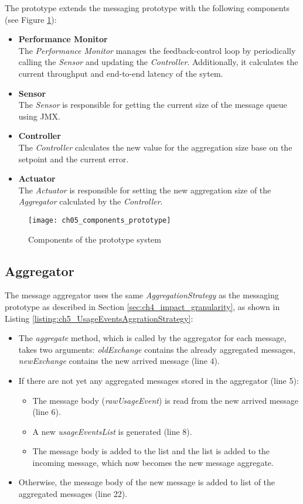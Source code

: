 The prototype extends the messaging prototype with the following components (see Figure \ref{fig:ch05_components_prototype}):
\begin{itemize}
	\item \textbf{Performance Monitor}\\
	The \emph{Performance Monitor} manages the feedback-control loop by periodically calling the \emph{Sensor} and updating the \emph{Controller}. Additionally, it calculates the current throughput and end-to-end latency of the sytem.
	\item \textbf{Sensor}\\
	The \emph{Sensor} is responsible for getting the current size of the message queue using \ac{JMX}.
	\item \textbf{Controller}\\
	The \emph{Controller} calculates the new value for the aggregation size base on the setpoint and the current error.
	\item \textbf{Actuator}\\
	The \emph{Actuator} is responsible for setting the new aggregation size of the \emph{Aggregator} calculated by the \emph{Controller}.
\end{itemize}

\begin{figure}[htbp]
	\centering
	\texttt{[image: ch05\_components\_prototype]}
	\caption{Components of the prototype system}
	\label{fig:ch05_components_prototype}
\end{figure}

\subsection{Aggregator}
The message aggregator uses the same \emph{AggregationStrategy} as the messaging prototype as described in Section \ref{sec:ch4_impact_granularity}, as shown in Listing \ref{listing:ch5_UsageEventsAggrationStrategy}:
\begin{itemize}
	\item The \emph{aggregate} method, which is called by the aggregator for each message, takes two arguments: \emph{oldExchange} contains the already aggregated messages, \emph{newExchange} contains the new arrived message (line 4).
	\item If there are not yet any aggregated messages stored in the aggregator (line 5):
	\begin{itemize}
		\item The message body (\emph{rawUsageEvent}) is read from the new arrived message (line 6).
		\item A new \emph{usageEventsList} is generated (line 8).
		\item The message body is added to the list and the list is added to the incoming message, which now becomes the new message aggregate.
	\end{itemize}
	\item Otherwise, the message body of the new message is added to list of the aggregated messages (line 22).
\end{itemize}


